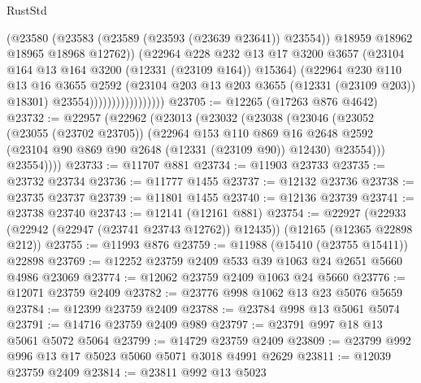 \begin{lexlean}{RustStd}
\begin{coremodule}
                                    (@23580
                                      (@23583 (@23589 (@23593 (@23639 @23641)) @23554))
                                      @18959
                                      @18962
                                      @18965
                                      @18968
                                      @12762))
                                  (@22964
                                    @228
                                    @232
                                    @13
                                    @17
                                    @3200
                                    @3657
                                    (@23104 @164 @13 @164 @3200 (@12331 (@23109 @164)) @15364)
                                    (@22964
                                      @230
                                      @110
                                      @13
                                      @16
                                      @3655
                                      @2592
                                      (@23104 @203 @13 @203 @3655 (@12331 (@23109 @203)) @18301)
                                      @23554)))))))))))))))))
@23705 := @12265 (@17263 @876 @4642)
@23732 := @22957
    (@22962
      (@23013
        (@23032
          (@23038
            (@23046
              (@23052
                (@23055 (@23702 @23705))
                (@22964
                  @153
                  @110
                  @869
                  @16
                  @2648
                  @2592
                  (@23104 @90 @869 @90 @2648 (@12331 (@23109 @90)) @12430)
                  @23554)))
            @23554))))
@23733 := @11707 @881
@23734 := @11903 @23733
@23735 := @23732 @23734
@23736 := @11777 @1455
@23737 := @12132 @23736
@23738 := @23735 @23737
@23739 := @11801 @1455
@23740 := @12136 @23739
@23741 := @23738 @23740
@23743 := @12141 (@12161 @881)
@23754 := @22927
    (@22933 (@22942 (@22947 (@23741 @23743 @12762)) @12435))
    (@12165 (@12365 @22898 @212))
@23755 := @11993 @876
@23759 := @11988 (@15410 (@23755 @15411)) @22898
@23769 := @12252 @23759 @2409 @533 @39 @1063 @24 @2651 @5660 @4986 @23069
@23774 := @12062 @23759 @2409 @1063 @24 @5660
@23776 := @12071 @23759 @2409
@23782 := @23776 @998 @1062 @13 @23 @5076 @5659
@23784 := @12399 @23759 @2409
@23788 := @23784 @998 @13 @5061 @5074
@23791 := @14716 @23759 @2409 @989
@23797 := @23791 @997 @18 @13 @5061 @5072 @5064
@23799 := @14729 @23759 @2409
@23809 := @23799 @992 @996 @13 @17 @5023 @5060 @5071 @3018 @4991 @2629
@23811 := @12039 @23759 @2409
@23814 := @23811 @992 @13 @5023

\end{coremodule}
\end{lexlean}
